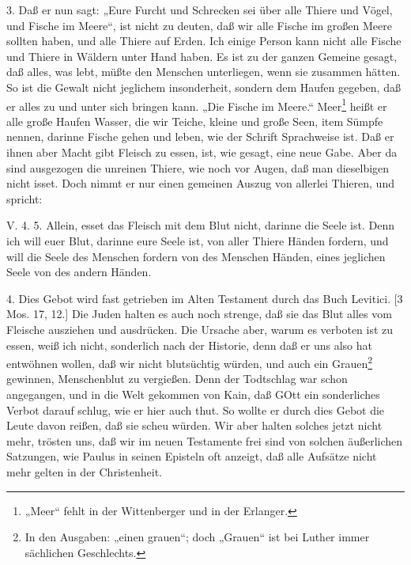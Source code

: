 3. Daß er nun sagt: „Eure Furcht und Schrecken sei über alle Thiere und Vögel, und Fische im Meere“, ist nicht zu deuten, daß wir alle Fische im großen Meere sollten haben, und alle Thiere auf Erden. Ich einige Person kann nicht alle Fische und Thiere in Wäldern unter Hand haben. Es ist zu der ganzen Gemeine gesagt, daß alles, was lebt, müßte den Menschen unterliegen, wenn sie zusammen hätten. So ist die Gewalt nicht jeglichem insonderheit, sondern dem Haufen gegeben, daß er alles zu und unter sich bringen kann. „Die Fische im Meere.“ Meer\footnote{„Meer“ fehlt in der Wittenberger und in der Erlanger.} heißt er alle große Haufen Wasser, die wir Teiche, kleine und große Seen, item Sümpfe nennen, darinne Fische gehen und leben, wie der Schrift Sprachweise ist. Daß er ihnen aber Macht gibt Fleisch zu essen, ist, wie gesagt, eine neue Gabe. Aber da sind ausgezogen die unreinen Thiere, wie noch vor Augen, daß man
dieselbigen nicht isset. Doch nimmt er nur einen gemeinen Auszug von allerlei Thieren, und spricht:

\begin{schriftzitat}
V. 4. 5. Allein, esset das Fleisch mit dem Blut nicht, darinne die Seele ist. Denn ich will euer Blut, darinne eure Seele ist, von aller Thiere Händen fordern, und will die Seele des Menschen fordern von des Menschen Händen, eines jeglichen Seele von des andern Händen.
\end{schriftzitat}

4. Dies Gebot wird fast getrieben im Alten Testament durch das Buch Levitici. [3 Mos. 17, 12.] Die Juden halten es auch noch strenge, daß sie das Blut alles vom Fleische ausziehen und ausdrücken. Die Ursache aber, warum es verboten ist zu essen, weiß ich nicht, sonderlich nach der Historie, denn daß er uns also hat entwöhnen wollen, daß wir nicht blutsüchtig würden, und auch ein Grauen\footnote{In den Ausgaben: „einen grauen“; doch „Grauen“ ist bei Luther immer sächlichen Geschlechts.} gewinnen, Menschenblut zu vergießen. Denn der Todtschlag war schon angegangen, und in die Welt gekommen von Kain, daß GOtt ein sonderliches Verbot darauf schlug, wie er hier auch thut. So wollte er durch dies Gebot die Leute davon reißen, daß sie scheu würden. Wir aber halten solches jetzt nicht mehr, trösten uns, daß wir im neuen Testamente frei sind von solchen äußerlichen Satzungen, wie Paulus in seinen Episteln oft anzeigt, daß alle Aufsätze nicht mehr gelten in der Christenheit.

